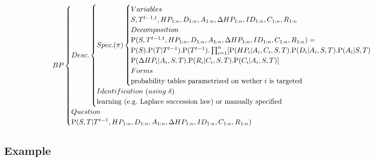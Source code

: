 \begin{eqnarray*}
BP
\begin{cases}
Desc.
    \begin{cases}
    Spec. (\pi)
        \begin{cases}
        Variables\\
        S, T^{t-1,t}, HP_{1:n}, D_{1:n}, A_{1:n}, \Delta HP_{1:n}, ID_{1:n}, C_{1:n}, R_{1:n}\\
        Decomposition\\
        \PP(S, T^{t-1,t}, HP_{1:n}, D_{1:n}, A_{1:n}, \Delta HP_{1:n}, ID_{1:n}, C_{1:n}, R_{1:n}) = \\
        \PP(S).\PP(T|T^{t-1}).\PP(T^{t-1}).\prod_{i=1}^n [ \PP(HP_i | A_i, C_i, S, T).\PP(D_i | A_i, S, T).\PP(A_i | S, T) \\
                \PP(\Delta HP_i | A_i, S, T). \PP(R_i | C_i, S, T). \PP(C_i | A_i, S, T) ]\\
        Forms\\
        \mathrm{probability\ tables\ parametrized\ on\ wether\ }i\ \mathrm{is\ targeted}\\
        \end{cases}\\
    Identification\ (using\ \delta)\\
    \mathrm{learning\ (e.g.\ Laplace\ succession\ law)\ or\ manually\ specified}\\
    \end{cases}\\
Question\\
\PP(S,T|T^{t-1}, HP_{1:n}, D_{1:n}, A_{1:n}, \Delta HP_{1:n}, ID_{1:n}, C_{1:n}, R_{1:n})
\end{cases}
\end{eqnarray*}

\subsection{Example}

